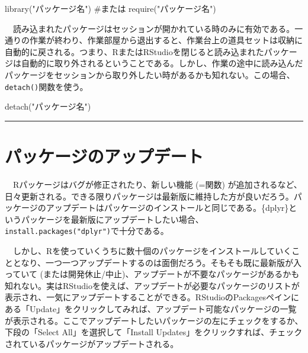\documentclass[
  a4paper,
  pandoc,
  ja=standard,
  jafont=haranoaji]{bxjsbook}
\newenvironment{Shaded}{\begin{snugshade}}{\end{snugshade}}
\newcommand{\CommentTok}[1]{\textcolor[rgb]{0.37,0.37,0.37}{#1}}
\newcommand{\FunctionTok}[1]{\textcolor[rgb]{0.28,0.35,0.67}{#1}}
\newcommand{\NormalTok}[1]{\textcolor[rgb]{0.00,0.48,0.65}{#1}}
\newcommand{\StringTok}[1]{\textcolor[rgb]{0.13,0.47,0.30}{#1}}
\begin{document}
\begin{Shaded}
\begin{Highlighting}[numbers=left,,]
\FunctionTok{library}\NormalTok{(}\StringTok{"パッケージ名"}\NormalTok{)}
\CommentTok{\#または}
\FunctionTok{require}\NormalTok{(}\StringTok{"パッケージ名"}\NormalTok{)}
\end{Highlighting}
\end{Shaded}

　読み込まれたパッケージはセッションが開かれている時のみに有効である。一通りの作業が終わり、作業部屋から退出すると、作業台上の道具セットは収納に自動的に戻される。つまり、RまたはRStudioを閉じると読み込まれたパッケージは自動的に取り外されるということである。しかし、作業の途中に読み込んだパッケージをセッションから取り外したい時があるかも知れない。この場合、\texttt{detach()}関数を使う。

\begin{Shaded}
\begin{Highlighting}[numbers=left,,]
\FunctionTok{detach}\NormalTok{(}\StringTok{"パッケージ名"}\NormalTok{)}
\end{Highlighting}
\end{Shaded}

\begin{center}\rule{0.5\linewidth}{0.5pt}\end{center}

\hypertarget{sec-packages_update}{%
\section{パッケージのアップデート}\label{sec-packages_update}}

　Rパッケージはバグが修正されたり、新しい機能 (=関数)
が追加されるなど、日々更新される。できる限りパッケージは最新版に維持した方が良いだろう。パッケージのアップデートはパッケージのインストールと同じである。\{dplyr\}というパッケージを最新版にアップデートしたい場合、\texttt{install.packages("dplyr")}で十分である。

　しかし、Rを使っていくうちに数十個のパッケージをインストールしていくこととなり、一つ一つアップデートするのは面倒だろう。そもそも既に最新版が入っていて
(または開発休止/中止)、アップデートが不要なパッケージがあるかも知れない。実はRStudioを使えば、アップデートが必要なパッケージのリストが表示され、一気にアップデートすることができる。RStudioのPackagesペインにある「Update」をクリックしてみれば、アップデート可能なパッケージの一覧が表示される。ここでアップデートしたいパッケージの左にチェックをするか、下段の「Select
All」を選択して「Install
Updates」をクリックすれば、チェックされているパッケージがアップデートされる。
\end{document}
